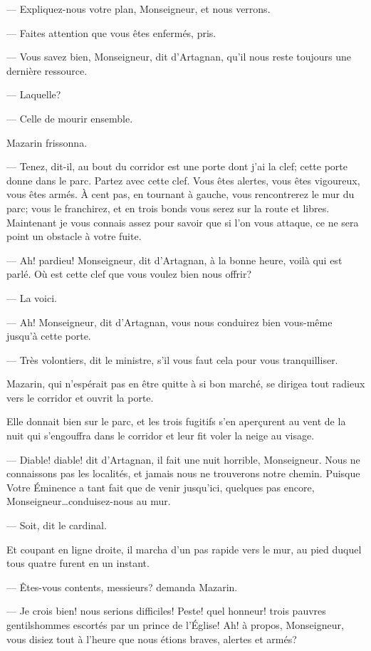 — Expliquez-nous votre plan, Monseigneur, et nous verrons.

— Faites attention que vous êtes enfermés, pris.

— Vous savez bien, Monseigneur, dit d'Artagnan, qu'il nous reste toujours une dernière ressource.

— Laquelle?

— Celle de mourir ensemble.

Mazarin frissonna.

— Tenez, dit-il, au bout du corridor est une porte dont j'ai la clef; cette porte donne dans le parc. Partez avec cette clef. Vous êtes alertes, vous êtes vigoureux, vous êtes armés. À cent pas, en tournant à gauche, vous rencontrerez le mur du parc; vous le franchirez, et en trois bonds vous serez sur la route et libres. Maintenant je vous connais assez pour savoir que si l'on vous attaque, ce ne sera point un obstacle à votre fuite.

— Ah! pardieu! Monseigneur, dit d'Artagnan, à la bonne heure, voilà qui est parlé. Où est cette clef que vous voulez bien nous offrir?

— La voici.

— Ah! Monseigneur, dit d'Artagnan, vous nous conduirez bien vous-même jusqu'à cette porte.

— Très volontiers, dit le ministre, s'il vous faut cela pour vous tranquilliser.

Mazarin, qui n'espérait pas en être quitte à si bon marché, se dirigea tout radieux vers le corridor et ouvrit la porte.

Elle donnait bien sur le parc, et les trois fugitifs s'en aperçurent au vent de la nuit qui s'engouffra dans le corridor et leur fit voler la neige au visage.

— Diable! diable! dit d'Artagnan, il fait une nuit horrible, Monseigneur. Nous ne connaissons pas les localités, et jamais nous ne trouverons notre chemin. Puisque Votre Éminence a tant fait que de venir jusqu'ici, quelques pas encore, Monseigneur\dots conduisez-nous au mur.

— Soit, dit le cardinal.

Et coupant en ligne droite, il marcha d'un pas rapide vers le mur, au pied duquel tous quatre furent en un instant.

— Êtes-vous contents, messieurs? demanda Mazarin.

— Je crois bien! nous serions difficiles! Peste! quel honneur! trois pauvres gentilshommes escortés par un prince de l'Église! Ah! à propos, Monseigneur, vous disiez tout à l'heure que nous étions braves, alertes et armés?

